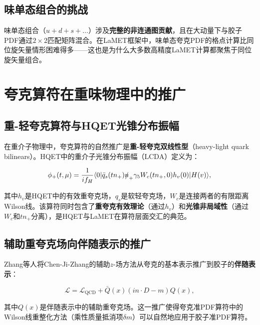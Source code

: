 \documentclass[12pt,a4paper]{ctexart}
\theoremstyle{definition}
\begin{document}
\subsection{味单态组合的挑战}

味单态组合（$u+d+s+\ldots$）涉及\textbf{完整的非连通图贡献}，且在大动量下与胶子PDF通过$2\times2$匹配矩阵混合\cite{Yao2023,Zhang2019}。在LaMET框架中，味单态夸克PDF的格点计算比同位旋矢量情形困难得多——这也是为什么大多数高精度LaMET计算都聚焦于同位旋矢量组合。

\section{夸克算符在重味物理中的推广}

\subsection{重-轻夸克算符与HQET光锥分布振幅}

在重介子物理中，夸克算符的自然推广是\textbf{重-轻夸克双线性型}（heavy-light quark bilinears）\cite{Han2025heavy}。HQET中的重介子光锥分布振幅（LCDA）定义为：

\begin{equation}
\phi_+(t, \mu) = \frac{1}{i f_H} \langle 0| \bar{q}_s(t n_+) \slashed{n}_+ \gamma_5 W_c(t n_+, 0) h_v(0) |H(v)\rangle,
\label{eq:heavy_light_LCDA}
\end{equation}

其中$h_v$是HQET中的有效重夸克场，$q_s$是软轻夸克场，$W_c$是连接两者的有限距离Wilson线。该算符同时包含了\textbf{重夸克有效理论}（通过$h_v$）和\textbf{光锥非局域性}（通过$W_c$和$t n_+$分离），是HQET与LaMET在算符层面交汇的典范\cite{Han2025heavy}。

\subsection{辅助重夸克场向伴随表示的推广}

Zhang等人\cite{Zhang2019}将Chen-Ji-Zhang的辅助$z$-场方法\cite{Chen2016improved}从夸克的基本表示推广到胶子的\textbf{伴随表示}：

\begin{equation}
\mathcal{L} = \mathcal{L}_{\text{QCD}} + \bar{Q}(x)(in \cdot D - m)Q(x),
\label{eq:adjoint_heavy_quark}
\end{equation}

其中$Q(x)$是伴随表示中的辅助重夸克场。这一推广使得夸克准PDF算符中的Wilson线重整化方法（乘性质量抵消项$\delta m$）可以自然地应用于胶子准PDF算符。
\end{document}
